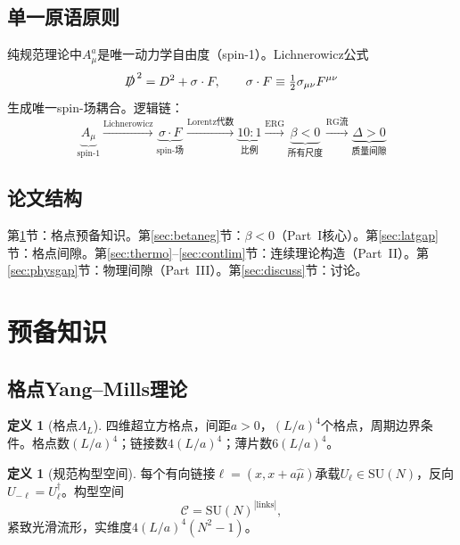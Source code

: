 \documentclass[12pt,a4paper]{article}
\theoremstyle{plain}
\theoremstyle{definition}
\newtheorem{definition}[theorem]{定义}
\theoremstyle{remark}
\begin{document}
\subsection{单一原语原则}\label{sec:primitive}

纯规范理论中$A_\mu^a$是唯一动力学自由度（spin-1）。Lichnerowicz公式
\begin{equation}\label{eq:Lich}
\slashed{D}^{\,2} = D^2 + \sigma\cdot F, \qquad \sigma\cdot F \equiv \tfrac{1}{2}\sigma_{\mu\nu}F^{\mu\nu}
\end{equation}
生成唯一spin-场耦合。逻辑链：
\begin{equation}\label{eq:chain}
\underbrace{A_\mu}_{\text{spin-1}} \xrightarrow{\text{Lichnerowicz}}
\underbrace{\sigma\cdot F}_{\text{spin-场}} \xrightarrow{\text{Lorentz代数}}
\underbrace{10{:}1}_{\text{比例}} \xrightarrow{\text{ERG}}
\underbrace{\beta<0}_{\text{所有尺度}} \xrightarrow{\text{RG流}}
\underbrace{\Delta>0}_{\text{质量间隙}}
\end{equation}

\subsection{论文结构}\label{sec:structure}

第\ref{sec:prelim}节：格点预备知识。第\ref{sec:betaneg}节：$\beta<0$（Part~I核心）。第\ref{sec:latgap}节：格点间隙。第\ref{sec:thermo}--\ref{sec:contlim}节：连续理论构造（Part~II）。第\ref{sec:physgap}节：物理间隙（Part~III）。第\ref{sec:discuss}节：讨论。

\section{预备知识}\label{sec:prelim}

\subsection{格点Yang--Mills理论}\label{sec:lattice}

\begin{definition}[格点$\Lambda_L$]\label{def:lattice}
四维超立方格点，间距$a>0$，$(L/a)^4$个格点，周期边界条件。格点数$(L/a)^4$；链接数$4(L/a)^4$；薄片数$6(L/a)^4$。
\end{definition}

\begin{definition}[规范构型空间]\label{def:config}
每个有向链接$\ell=(x,x+a\hat\mu)$承载$U_\ell\in\mathrm{SU}(N)$，反向$U_{-\ell}=U_\ell^\dagger$。构型空间
\begin{equation}\label{eq:config}
\mathcal{C} = \mathrm{SU}(N)^{|\mathrm{links}|},
\end{equation}
紧致光滑流形，实维度$4(L/a)^4(N^2-1)$。
\end{definition}
\end{document}
